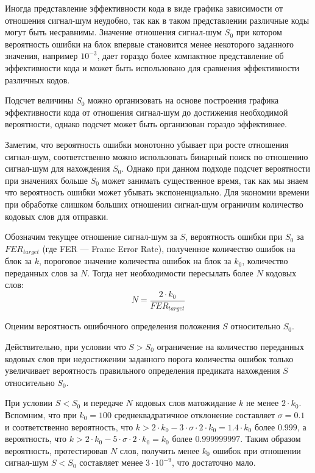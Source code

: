 Иногда представление эффективности кода в виде графика зависимости
от отношения сигнал-шум неудобно, так как в таком представлении различные
коды могут быть несравнимы. Значение отношения сигнал-шум $S_0$ при котором вероятность
ошибки на блок впервые становится менее некоторого заданного значения, например $10^{-3}$,
дает гораздо более компактное представление об эффективности кода и может быть использовано
для сравнения эффективности различных кодов.

Подсчет величины $S_0$ можно организовать на основе построения графика эффективности
кода от отношения сигнал-шум до достижения необходимой вероятности, однако подсчет
может быть организован гораздо эффективнее.

Заметим, что вероятность ошибки монотонно убывает при росте отношения сигнал-шум,
соответственно можно использовать бинарный поиск по отношению сигнал-шум для нахождения
$S_0$. Однако при данном подходе подсчет вероятности при значениях больше $S_0$ может
занимать существенное время, так как мы знаем что вероятность ошибки может убывать экспоненциально.
Для экономии времени при обработке слишком больших отношении сигнал-шум ограничим количество
кодовых слов для отправки. 

Обозначим текущее отношение сигнал-шум за $S$, вероятность ошибки
при $S_0$ за $FER_{target}$ (где FER --- Frame Error Rate), полученное количество ошибок на блок
за $k$, пороговое значение количества ошибок
на блок за $k_0$, количество переданных слов за $N$. Тогда нет необходимости пересылать
более $N$ кодовых слов:
\[
	N = \frac{2 \cdot k_0}{FER_{target}}
\]

Оценим вероятность ошибочного определения положения $S$ относительно $S_0$.

Действительно, при условии что $S > S_0$ ограничение на количество переданных кодовых слов
при недостижении заданного порога количества ошибок только увеличивает вероятность правильного определения
предиката нахождения $S$ относительно $S_0$. 

При условии $S < S_0$ и передаче $N$ кодовых слов 
матожидание $k$ не менее $2 \cdot k_0$. Вспомним, что при $k_0=100$ среднеквадратичное отклонение 
составляет $\sigma=0.1$ 
и соответственно вероятность, что $k > 2 \cdot k_0 - 3 \cdot \sigma \cdot 2 \cdot k_0 = 1.4 \cdot k_0$
 более $0.999$, а вероятность, что $k > 2 \cdot k_0 - 5 \cdot \sigma \cdot 2 \cdot k_0 = k_0$ более $0.999999997$.
Таким образом вероятность, протестировав $N$ слов, получить менее $k_0$ ошибок при отношении сигнал-шум
$S < S_0$ составляет менее $3 \cdot 10^{-9}$, что достаточно мало.

